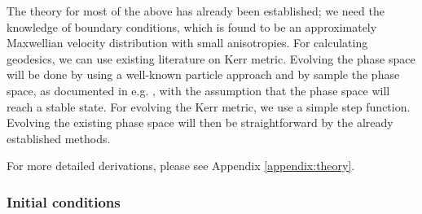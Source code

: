 \documentclass[12pt]{article}
\begin{document}
The theory for most of the above has already been established; 
we need the knowledge of boundary conditions, which is found to be 
an approximately Maxwellian velocity distribution \citep{dm_halo_maxwellian} with small anisotropies. 
For calculating geodesics, we can use 
existing literature on Kerr metric. Evolving the 
phase space will be done by using a well-known particle approach and by sample the phase space, 
as documented in e.g. 
\citep{kuhlen2012numerical,schnittman2015}, with the assumption that the phase space will 
reach a stable state. For evolving the Kerr metric, we use a simple step function. Evolving 
the existing phase space will then be straightforward by the already established methods.


% 
% 
% 



% 
% 
% 
% 
% 
% 
% 

For more detailed derivations, please see Appendix \ref{appendix:theory}.

\subsubsection{Initial conditions}
\end{document}
